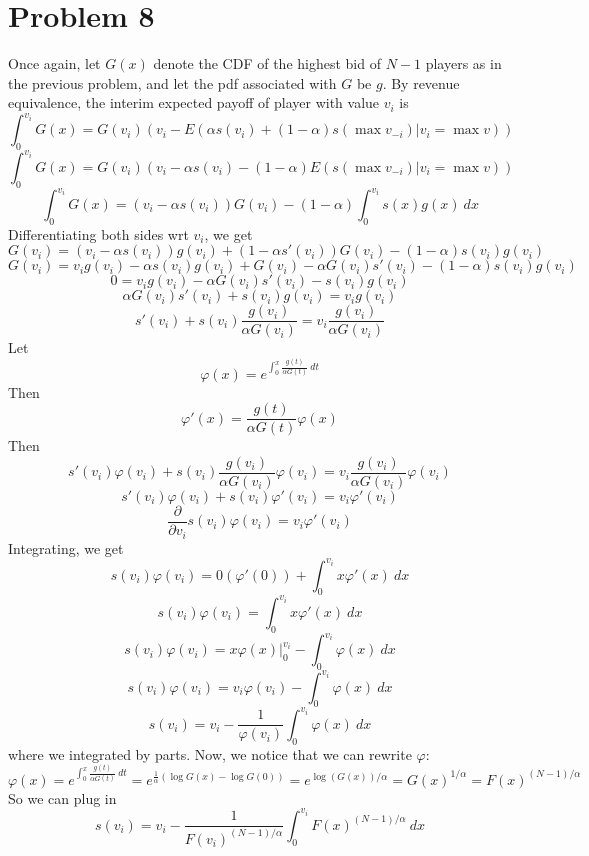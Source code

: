 \documentclass[10pt,letter]{article}
\begin{document}
\section*{Problem 8}
Once again, let $G(x)$ denote the CDF of the highest bid of $N-1$ players as in the previous problem, and let the pdf associated with $G$ be $g$. By revenue equivalence, the interim expected payoff of player with value $v_i$ is
\[ \int_{0}^{v_i} G(x) = G(v_i) \left( v_i - E(\alpha s(v_i) + (1-\alpha) s(\max v_{-i}) | v_i = \max v)\right)  \]
\[ \int_{0}^{v_i} G(x) = G(v_i) \left( v_i - \alpha s(v_i)  - (1-\alpha) E( s(\max v_{-i}) | v_i = \max v)\right)  \]
\[ \int_{0}^{v_i} G(x) = (v_i - \alpha s(v_i))G(v_i) - (1-\alpha) \int_0^{v_i}  s(x) g(x) \ dx \]
Differentiating both sides wrt $v_i$, we get
\[ G(v_i) = (v_i - \alpha s(v_i))g(v_i) + (1 - \alpha s'(v_i))G(v_i)  - (1-\alpha)s(v_i) g(v_i)  \]
\[ G(v_i) = v_i g(v_i) - \alpha s(v_i) g(v_i) + G(v_i) - \alpha G(v_i) s'(v_i) - (1-\alpha) s(v_i) g(v_i)  \]
\[ 0 = v_i g(v_i)  - \alpha G(v_i) s'(v_i) -  s(v_i) g(v_i)  \]
\[ \alpha G(v_i) s'(v_i) + s(v_i) g(v_i)  = v_i g(v_i)    \]
\[  s'(v_i) + s(v_i) \frac{g(v_i)}{\alpha G(v_i)}  = v_i \frac{g(v_i)}{\alpha G(v_i)}    \]
Let \[ \varphi(x) = e^{\int_{0}^x \frac{g(t)}{\alpha G(t)} \ dt}  \]
Then \[ \varphi'(x) = \frac{g(t)}{\alpha G(t)} \varphi(x) \]
Then
\[  s'(v_i)\varphi(v_i) + s(v_i) \frac{g(v_i)}{\alpha G(v_i)} \varphi(v_i) = v_i \frac{g(v_i)}{\alpha G(v_i)} \varphi(v_i)   \]
\[  s'(v_i)\varphi(v_i) + s(v_i) \varphi' (v_i) = v_i \varphi'(v_i)   \]
\[ \frac{\partial}{\partial v_i} s(v_i)\varphi(v_i) = v_i \varphi'(v_i) \]
Integrating, we get
\[ s(v_i)\varphi(v_i) = 0(\varphi'(0)) + \int_{0}^{v_i} x \varphi'(x) \ dx  \]
\[ s(v_i)\varphi(v_i) = \int_{0}^{v_i} x \varphi'(x) \ dx  \]
\[ s(v_i)\varphi(v_i) = x \varphi(x) \Bigr|_0^{v_i} - \int_{0}^{v_i} \varphi(x) \ dx  \]
\[ s(v_i)\varphi(v_i) = v_i \varphi(v_i)  - \int_{0}^{v_i} \varphi(x) \ dx  \]
\[ s(v_i) = v_i  - \frac{1}{\varphi(v_i)}\int_{0}^{v_i} \varphi(x) \ dx  \]
where we integrated by parts. Now, we notice that we can rewrite $\varphi:$
\[ \varphi(x) = e^{\int_{0}^x \frac{g(t)}{\alpha G(t)} \ dt} = e^{\frac{1}{\alpha} (\log G(x) - \log G(0))} = e^{\log(G(x))/\alpha} = G(x)^{1/\alpha} = F(x)^{(N-1)/\alpha}  \]
So we can plug in
\[ s(v_i) = v_i  - \frac{1}{F(v_i)^{(N-1)/\alpha}}\int_{0}^{v_i} F(x)^{(N-1)/\alpha} \ dx  \]
\end{document}
